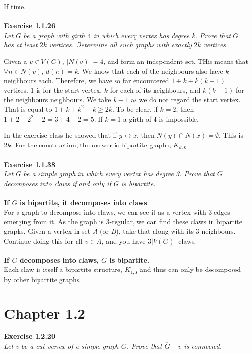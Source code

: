If time.
\\\\
\noindent
\textbf{Exercise 1.1.26}\\
\noindent
\textit{Let $G$ be a graph with girth $4$ in which every vertex has degree $k$. Prove that $G$ has at least $2k$ vertices. Determine all such graphs with exactly $2k$ vertices.}

Given a $v \in V(G)$, $|N(v)| = 4$, and form an independent set. THis means that $\forall n \in N(v)$, $d(n) = k$. We know that each of the neighbours also have $k$ neighbours each. Therefore, we have so far encountered $1 + k + k(k-1)$ vertices. 1 is for the start vertex, $k$ for each of its neighbours, and $k(k-1)$ for the neighbours neighbours. We take $k-1$ as we do not regard the start vertex. That is equal to $1 + k + k^{2} -k \ge 2k$. To be clear, if $k = 2$, then $1 + 2 + 2^{2} - 2 = 3 + 4 - 2 = 5$. If $k = 1$ a girth of $4$ is impossible.

In the exercise class he showed that if $y \leftrightarrow x$, then $N(y) \cap N(x) = \emptyset$. This is $2k$. For the construction, the answer is bipartite graphs, $K_{k,k}$
\\\\
\noindent
\textbf{Exercise 1.1.38}\\
\noindent
\textit{Let $G$ be a simple graph in which every vertex has degree 3. Prove that $G$ decomposes into claws if and only if $G$ is bipartite.}\\\\
\noindent
\textbf{If $G$ is bipartite, it decomposes into claws}.\\
\noindent
For a graph to decompose into claws, we can see it as a vertex with 3 edges emerging from it. As the graph is $3$-regular, we can find these claws in bipartite graphs. Given a vertex in set $A$ (or $B$), take that along with its 3 neighbours. Continue doing this for all $v \in A$, and you have $3|V(G)|$ claws.\\\\
\noindent
\textbf{If $G$ decomposes into claws, $G$ is bipartite.}\\
\noindent
Each claw is itself a bipartite structure, $K_{1,3}$ and thus can only be decomposed by other bipartite graphs.


\section{Chapter 1.2}
\noindent
\textbf{Exercise 1.2.20}\\
\noindent
\textit{Let $v$ be a cut-vertex of a simple graph $G$. Prove that $\overline{G} - v$ is connected.}

